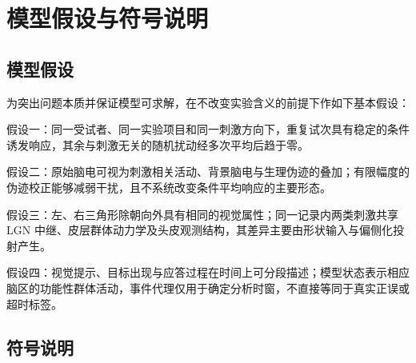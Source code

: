 \documentclass[a4paper,zihao=-4,linespread=1]{ctexart}
\numberwithin{figure}{section}       %
\begin{document}
\section{模型假设与符号说明}

\subsection{模型假设}

为突出问题本质并保证模型可求解，在不改变实验含义的前提下作如下基本假设：

假设一：同一受试者、同一实验项目和同一刺激方向下，重复试次具有稳定的条件诱发响应，其余与刺激无关的随机扰动经多次平均后趋于零。

假设二：原始脑电可视为刺激相关活动、背景脑电与生理伪迹的叠加；有限幅度的伪迹校正能够减弱干扰，且不系统改变条件平均响应的主要形态。

假设三：左、右三角形除朝向外具有相同的视觉属性；同一记录内两类刺激共享 LGN 中继、皮层群体动力学及头皮观测结构，其差异主要由形状输入与偏侧化投射产生。

假设四：视觉提示、目标出现与应答过程在时间上可分段描述；模型状态表示相应脑区的功能性群体活动，事件代理仅用于确定分析时窗，不直接等同于真实正误或超时标签。


\subsection{符号说明}
\end{document}
